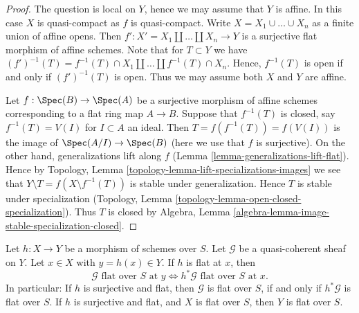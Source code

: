\begin{proof}
The question is local on $Y$, hence we may assume that $Y$ is affine.
In this case $X$ is quasi-compact as $f$ is quasi-compact.
Write $X = X_1 \cup \ldots \cup X_n$ as a finite union of affine opens.
Then $f' : X' = X_1 \amalg \ldots \amalg X_n \to Y$ is a surjective
flat morphism of affine schemes. Note that for $T \subset Y$ we have
$(f')^{-1}(T) = f^{-1}(T) \cap X_1 \amalg \ldots \amalg f^{-1}(T) \cap X_n$.
Hence, $f^{-1}(T)$ is open if and only if $(f')^{-1}(T)$ is open.
Thus we may assume both $X$ and $Y$ are affine.

\medskip\noindent
Let $f : \Spec(B) \to \Spec(A)$ be a surjective
morphism of affine schemes corresponding to a flat ring map $A \to B$.
Suppose that $f^{-1}(T)$ is closed, say $f^{-1}(T) = V(I)$ for $I \subset A$
an ideal. Then $T = f(f^{-1}(T)) = f(V(I))$ is the image of
$\Spec(A/I) \to \Spec(B)$ (here we use that $f$
is surjective). On the other hand, generalizations lift along $f$
(Lemma \ref{lemma-generalizations-lift-flat}).
Hence by Topology, Lemma \ref{topology-lemma-lift-specializations-images}
we see that $Y \setminus T = f(X \setminus f^{-1}(T))$ is stable under
generalization. Hence $T$ is stable under specialization
(Topology, Lemma \ref{topology-lemma-open-closed-specialization}).
Thus $T$ is closed by
Algebra, Lemma \ref{algebra-lemma-image-stable-specialization-closed}.
\end{proof}

\begin{lemma}
\label{lemma-flat-permanence}
Let $h : X \to Y$ be a morphism of schemes over $S$.
Let $\mathcal{G}$ be a quasi-coherent sheaf on $Y$.
Let $x \in X$ with $y = h(x) \in Y$. If $h$ is flat at $x$, then
$$
\mathcal{G}\text{ flat over }S\text{ at }y
\Leftrightarrow
h^*\mathcal{G}\text{ flat over }S\text{ at }x.
$$
In particular: If $h$ is surjective and flat, then
$\mathcal{G}$ is flat over $S$, if and only if
$h^*\mathcal{G}$ is flat over $S$. If $h$ is surjective and
flat, and $X$ is flat over $S$, then $Y$ is flat over $S$.
\end{lemma}

